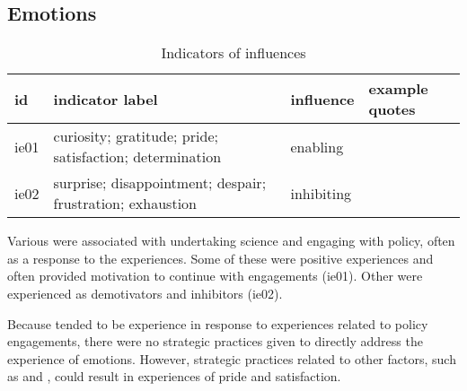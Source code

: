 \subsection{Emotions}\label{sec:resemotions}

\begin{table}[!ht]
\footnotesize
\caption{Indicators of \skiemot{} influences}\label{tab:resemot}
\begin{tabular}{L{.07\linewidth}L{.3\linewidth}L{.11\linewidth}L{.52\linewidth}} \hline
\textbf{id} & \textbf{indicator label} & \textbf{influence} & \textbf{example quotes} \\ \hline \hline 
ie01 & curiosity; gratitude; pride; satisfaction; determination & enabling &  \vfill {} \\[5mm] 
ie02 & surprise; disappointment; despair; frustration; exhaustion & inhibiting &  \vfill {} \\[5mm] \hline
\end{tabular}
\end{table}

Various \ismie{} were associated with undertaking science and engaging with policy, often as a response to the experiences. Some of these were positive experiences and often provided motivation to continue with engagements (ie01). Other were experienced as demotivators and inhibitors (ie02).

Because \ismie{} tended to be experience in response to experiences related to policy engagements, there were no strategic practices given to directly address the experience of emotions. However, strategic practices related to other factors, such as \skipers{} and \skiskil, could result in experiences of pride and satisfaction.

\subsection{\titagen}\label{sec:resskiagen}

